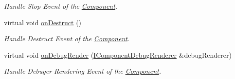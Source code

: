 \begin{DoxyCompactItemize}
\begin{DoxyCompactList}\small\item\em Handle Stop Event of the \hyperlink{class_i_dream_sky_1_1_component}{Component}. \end{DoxyCompactList}\item 
virtual void \hyperlink{class_i_dream_sky_1_1_skeletal_animation_model_ad3a4a6037953def34b479931785bfd4f}{on\+Destruct} ()\hypertarget{class_i_dream_sky_1_1_skeletal_animation_model_ad3a4a6037953def34b479931785bfd4f}{}\label{class_i_dream_sky_1_1_skeletal_animation_model_ad3a4a6037953def34b479931785bfd4f}

\begin{DoxyCompactList}\small\item\em Handle Destruct Event of the \hyperlink{class_i_dream_sky_1_1_component}{Component}. \end{DoxyCompactList}\item 
virtual void \hyperlink{class_i_dream_sky_1_1_skeletal_animation_model_a5fc735217ba64af2114fa05dfc00759b}{on\+Debug\+Render} (\hyperlink{class_i_dream_sky_1_1_i_component_debug_renderer}{I\+Component\+Debug\+Renderer} \&debug\+Renderer)\hypertarget{class_i_dream_sky_1_1_skeletal_animation_model_a5fc735217ba64af2114fa05dfc00759b}{}\label{class_i_dream_sky_1_1_skeletal_animation_model_a5fc735217ba64af2114fa05dfc00759b}

\begin{DoxyCompactList}\small\item\em Handle Debuger Rendering Event of the \hyperlink{class_i_dream_sky_1_1_component}{Component}. \end{DoxyCompactList}\end{DoxyCompactItemize}
